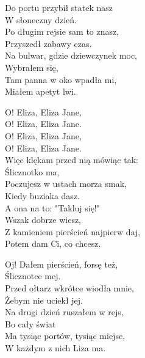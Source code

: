 \begin{text}
   
    Do portu przybił statek nasz\\       
    W słoneczny dzień.\\                 
    Po długim rejsie sam to znasz,\\   
    Przyszedł zabawy czas.\\             
    Na bulwar, gdzie dziewczynek moc,\\ 
    Wybrałem się,\\                     
    Tam panna w oko wpadła mi,\\         
    Miałem apetyt lwi.                

    \vin O! Eliza, Eliza Jane,\\              
    \vin O! Eliza, Eliza Jane.\\              
    \vin O! Eliza, Eliza Jane,\\              
    \vin O! Eliza, Eliza Jane.\\             

    Więc klękam przed nią mówiąc tak:\\
    Ślicznotko ma,\\
    Poczujesz w ustach morza smak,\\
    Kiedy buziaka dasz.\\
    A ona na to: "Takluj się!"\\
    Wszak dobrze wiesz,\\
    Z kamieniem pierścień najpierw daj,\\
    Potem dam Ci, co chcesz.

    Oj! Dałem pierścień, forsę też,\\
    Ślicznotce mej.\\
    Przed ołtarz wkrótce wiodła mnie,\\
    Żebym nie uciekł jej.\\
    Na drugi dzień ruszałem w rejs,\\
    Bo cały świat\\
    Ma tysiąc portów, tysiąc miejsc,\\
    W każdym z nich Liza ma.
   

\end{text}
